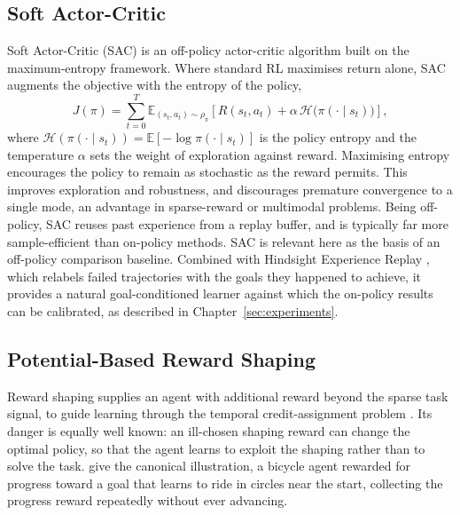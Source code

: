 \subsection{Soft Actor-Critic}
\label{sec:sac}

Soft Actor-Critic (SAC) \cite{Haarnoja2018SoftAO} is an off-policy actor-critic
algorithm built on the maximum-entropy framework. Where standard RL maximises
return alone, SAC augments the objective with the entropy of the policy,
\begin{equation}
    J(\pi) = \sum_{t=0}^{T} \mathbb{E}_{(s_t, a_t) \sim \rho_{\pi}}\!\left[ R(s_t, a_t) + \alpha\, \mathcal{H}\big(\pi(\cdot \mid s_t)\big) \right],
    \label{eq:sac}
\end{equation}
where $\mathcal{H}(\pi(\cdot \mid s_t)) = \mathbb{E}[-\log \pi(\cdot \mid s_t)]$
is the policy entropy and the temperature $\alpha$ sets the weight of exploration
against reward. Maximising entropy encourages the policy to remain as stochastic
as the reward permits. This improves exploration and robustness, and discourages
premature convergence to a single mode, an advantage in sparse-reward or
multimodal problems. Being off-policy, SAC reuses past experience from a replay
buffer, and is typically far more sample-efficient than on-policy methods. SAC is
relevant here as the basis of an off-policy comparison baseline. Combined with
Hindsight Experience Replay \cite{Andrychowicz2017}, which relabels failed
trajectories with the goals they happened to achieve, it provides a natural
goal-conditioned learner against which the on-policy results can be calibrated, as
described in Chapter~\ref{sec:experiments}.

\subsection{Potential-Based Reward Shaping}
\label{sec:pbrs}

Reward shaping supplies an agent with additional reward beyond the sparse task
signal, to guide learning through the temporal credit-assignment problem
\cite{Grzes2017RewardShaping}. Its danger is equally well known: an ill-chosen
shaping reward can change the optimal policy, so that the agent learns to exploit
the shaping rather than to solve the task. \cite{Ng1999PolicyInvariance} give the
canonical illustration, a bicycle agent rewarded for progress toward a goal that
learns to ride in circles near the start, collecting the progress reward
repeatedly without ever advancing.

